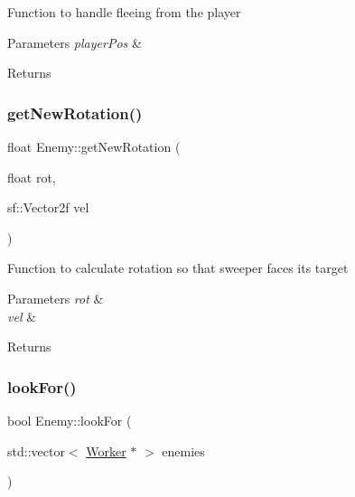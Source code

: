 Function to handle fleeing from the player 


\begin{DoxyParams}{Parameters}
{\em player\+Pos} & \\
\hline
\end{DoxyParams}
\begin{DoxyReturn}{Returns}

\end{DoxyReturn}
\mbox{\label{class_enemy_ae7981b82c023a8c6884c52df3f9e3125}} 
\subsubsection{\texorpdfstring{getNewRotation()}{getNewRotation()}}
{\footnotesize\ttfamily float Enemy\+::get\+New\+Rotation (\begin{DoxyParamCaption}\item[{float}]{rot,  }\item[{sf\+::\+Vector2f}]{vel }\end{DoxyParamCaption})}



Function to calculate rotation so that sweeper faces its target 


\begin{DoxyParams}{Parameters}
{\em rot} & \\
\hline
{\em vel} & \\
\hline
\end{DoxyParams}
\begin{DoxyReturn}{Returns}

\end{DoxyReturn}
\mbox{\label{class_enemy_a6217993e1dcaae812723d71b2cdf496f}} 
\subsubsection{\texorpdfstring{lookFor()}{lookFor()}}
{\footnotesize\ttfamily bool Enemy\+::look\+For (\begin{DoxyParamCaption}\item[{std\+::vector$<$ \mbox{\hyperlink{class_worker}{Worker}} $\ast$ $>$}]{enemies }\end{DoxyParamCaption})}



